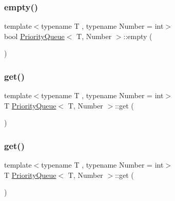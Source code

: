 \mbox{\label{structPriorityQueue_a422e38d0c3b8398dc6e4867bb4ceec41}} 
\subsubsection{\texorpdfstring{empty()}{empty()}\hspace{0.1cm}{\footnotesize\ttfamily [2/2]}}
{\footnotesize\ttfamily template$<$typename T , typename Number  = int$>$ \\
bool \mbox{\hyperlink{structPriorityQueue}{Priority\+Queue}}$<$ T, Number $>$\+::empty (\begin{DoxyParamCaption}{ }\end{DoxyParamCaption})\hspace{0.3cm}{\ttfamily [inline]}}

\mbox{\label{structPriorityQueue_ab211c9583fda5c1a6352021444af5f0e}} 
\subsubsection{\texorpdfstring{get()}{get()}\hspace{0.1cm}{\footnotesize\ttfamily [1/2]}}
{\footnotesize\ttfamily template$<$typename T , typename Number  = int$>$ \\
T \mbox{\hyperlink{structPriorityQueue}{Priority\+Queue}}$<$ T, Number $>$\+::get (\begin{DoxyParamCaption}{ }\end{DoxyParamCaption})\hspace{0.3cm}{\ttfamily [inline]}}

\mbox{\label{structPriorityQueue_ab211c9583fda5c1a6352021444af5f0e}} 
\subsubsection{\texorpdfstring{get()}{get()}\hspace{0.1cm}{\footnotesize\ttfamily [2/2]}}
{\footnotesize\ttfamily template$<$typename T , typename Number  = int$>$ \\
T \mbox{\hyperlink{structPriorityQueue}{Priority\+Queue}}$<$ T, Number $>$\+::get (\begin{DoxyParamCaption}{ }\end{DoxyParamCaption})\hspace{0.3cm}{\ttfamily [inline]}}


